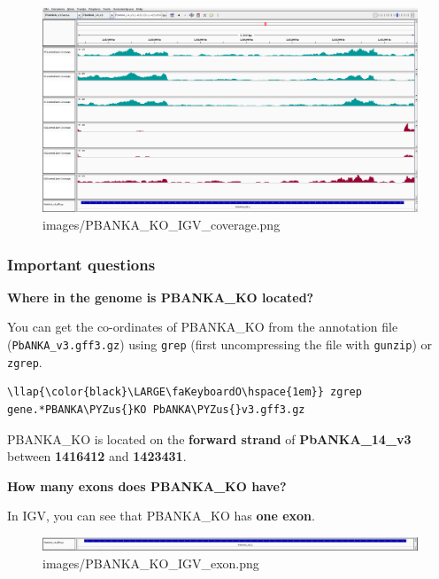 \documentclass[11pt]{article}
\makeatletter
\def\maxwidth{\ifdim\Gin@nat@width>\linewidth\linewidth
    \else\Gin@nat@width\fi}
\let\Oldincludegraphics\includegraphics
\renewcommand{\includegraphics}[1]{\Oldincludegraphics[width=.8\maxwidth, height=.55\textheight, keepaspectratio]{#1}}
\def\PYZus{\char`\_}
\makeatother
\begin{document}
    \begin{figure}[!h]
\centering
\includegraphics{images/PBANKA_KO_IGV_coverage.png}
\caption{images/PBANKA\_KO\_IGV\_coverage.png}
\end{figure}

    \subsubsection{Important questions}\label{important-questions}

\textbf{Where in the genome is PBANKA\_KO located?}

You can get the co-ordinates of PBANKA\_KO from the annotation file
(\texttt{PbANKA\_v3.gff3.gz}) using \texttt{grep} (first uncompressing
the file with \texttt{gunzip}) or \texttt{zgrep}.

\begin{terminalinput}
\begin{Verbatim}[commandchars=\\\{\}]
\llap{\color{black}\LARGE\faKeyboardO\hspace{1em}} zgrep gene.*PBANKA\PYZus{}KO PbANKA\PYZus{}v3.gff3.gz
\end{Verbatim}
\end{terminalinput}


    PBANKA\_KO is located on the \textbf{forward strand} of
\textbf{PbANKA\_14\_v3} between \textbf{1416412} and \textbf{1423431}.

    \textbf{How many exons does PBANKA\_KO have?}

In IGV, you can see that PBANKA\_KO has \textbf{one exon}.

    \begin{figure}[!h]
\centering
\includegraphics{images/PBANKA_KO_IGV_exon.png}
\caption{images/PBANKA\_KO\_IGV\_exon.png}
\end{figure}
\end{document}
